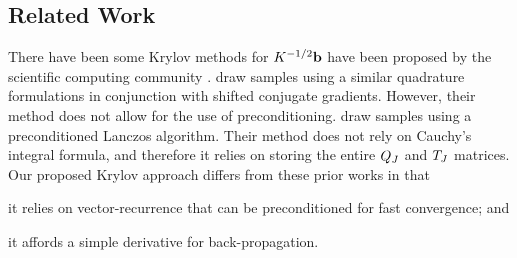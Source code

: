 




\subsection{Related Work}
There have been some Krylov methods for $K^{-1/2} \mathbf{b}$ have been proposed by the scientific computing community \cite{aune2013iterative,aune2014parameter,chow2014preconditioned,saibaba2013flexible}.
\citet{aune2013iterative,aune2014parameter} draw samples using a similar quadrature formulations in conjunction with shifted conjugate gradients.
However, their method does not allow for the use of preconditioning.
\citet{chow2014preconditioned} draw samples using a preconditioned Lanczos algorithm.
Their method does not rely on Cauchy's integral formula, and therefore it relies on storing the entire $Q_J$ and $T_J$ matrices.
Our proposed Krylov approach differs from these prior works in that
\begin{enumerate*}
  \item it relies on vector-recurrence that can be preconditioned for fast convergence; and
  \item it affords a simple derivative for back-propagation.
\end{enumerate*}
